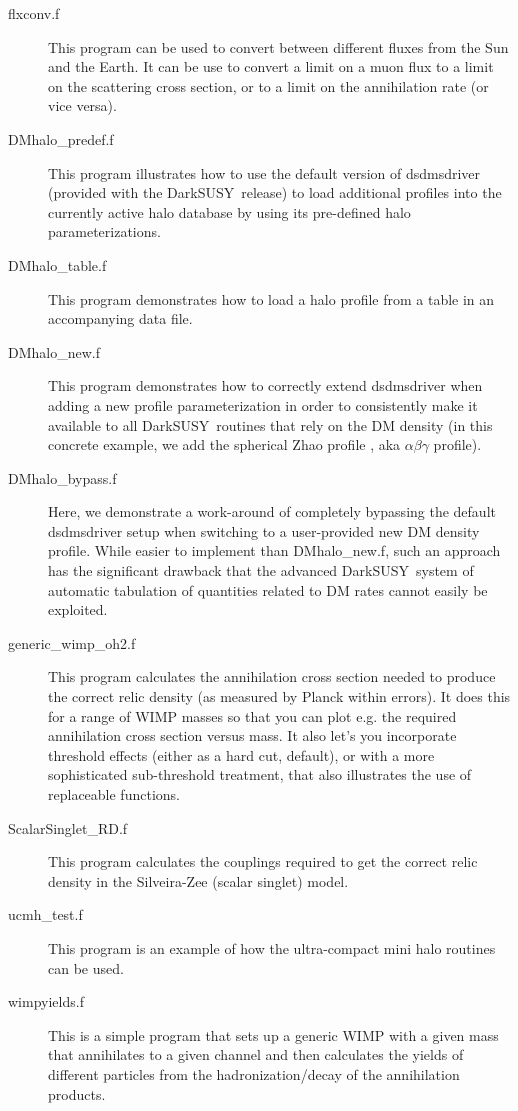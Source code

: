 \documentclass[a4paper,10pt,oneside]{book}
\newcommand{\code}[1]{\ft{#1}}
\newcommand{\ds}{{\sffamily DarkSUSY}}
\newcommand{\ft}[1]{\textsf{#1}}
\begin{document}
\begin{description}
\item[\code{flxconv.f}] This program can be used to convert between different fluxes from the Sun and the Earth. It can be use to convert a limit on a muon flux to a limit on the scattering cross section, or to a limit on the annihilation rate (or vice versa).
\item[\code{DMhalo\_predef.f}] This program illustrates how to use the default version of \code{dsdmsdriver} 
(provided with the \ds\ release) to load additional profiles into the currently active halo database by using its 
pre-defined halo parameterizations.
\item[\code{DMhalo\_table.f}] This program demonstrates how to load a halo profile from a table in an 
accompanying data file.
\item[\code{DMhalo\_new.f}] This program demonstrates how to correctly extend \code{dsdmsdriver} when adding a new profile parameterization in order to consistently make it available to all \ds\ routines that rely on the 
DM density (in this concrete example, we add the spherical Zhao profile \cite{Zhao:1995cp}, 
aka $\alpha\beta\gamma$ profile).
\item[\code{DMhalo\_bypass.f}] Here, we  demonstrate a work-around of completely bypassing the default \code{dsdmsdriver} setup when switching to a user-provided new DM density profile. While easier to 
implement than \code{DMhalo\_new.f}, such an approach has the significant drawback that the advanced \ds\ 
system of automatic tabulation of quantities related to DM rates cannot easily be exploited.
\item[\code{generic\_wimp\_oh2.f}] This program calculates the annihilation cross section needed to produce the correct relic density (as measured by Planck within errors). It does this for a range of WIMP masses so that you can plot e.g. the required annihilation cross section versus mass. It also let's you incorporate threshold effects (either as a hard cut, default), or with a more sophisticated sub-threshold treatment, that also illustrates the use of replaceable functions.
\item[\code{ScalarSinglet\_RD.f}] This program calculates the couplings required to get the correct relic density in the Silveira-Zee (scalar singlet) model.
\item[\code{ucmh\_test.f}] This program is an example of how the ultra-compact mini halo routines can be used.
\item[\code{wimpyields.f}] This is a simple program that sets up a generic WIMP with a given mass that annihilates to a given channel and then calculates the yields of different particles from the hadronization/decay of the annihilation products.

\end{description}
\end{document}
